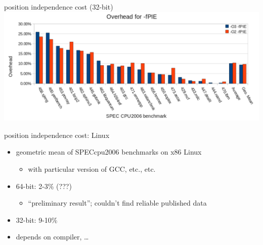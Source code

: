 \usetikzlibrary{calc}
\begin{frame}{position independence cost (32-bit)}
\includegraphics[width=\textwidth]{../mitigate/pie-cost}
\end{frame}

\begin{frame}{position independence cost: Linux}
\begin{itemize}
    \item geometric mean of SPECcpu2006 benchmarks on x86 Linux
        \begin{itemize}
            \item with particular version of GCC, etc., etc.
        \end{itemize}
    \item 64-bit: 2-3\% (???)
        \begin{itemize}
        \item ``preliminary result''; couldn't find reliable published data
        \end{itemize}
    \item 32-bit: 9-10\%
    \item depends on compiler, \ldots
\end{itemize}
\end{frame}

